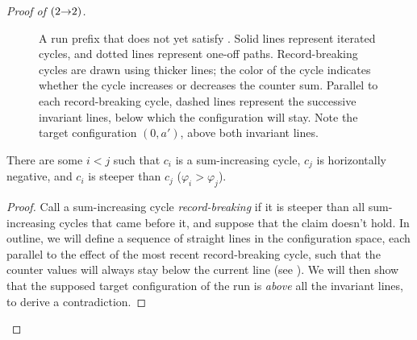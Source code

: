 \begin{proof}[Proof of  $({2}{\rightarrow}{2})$]
\begin{figure}[t]

\caption{A run prefix that does not yet satisfy .
Solid lines represent iterated cycles, and dotted lines represent 
one-off paths. Record-breaking cycles are drawn using thicker lines;
the color of the cycle indicates whether the cycle increases
or decreases the counter sum.
Parallel to each record-breaking cycle, dashed lines represent
the successive invariant lines, below which the configuration
will stay.
Note the target configuration $(0,a')$, above both invariant lines.
}
\label{fig:steep-counterexample}
\end{figure}


\begin{claim} \label{claim:steep}
    There are some $i<j$ such that $c_i$ is a sum-increasing cycle, $c_j$ is
    horizontally negative, and $c_i$ is steeper than $c_j$ (\ie $\varphi_i > \varphi_j$).
\end{claim}
%
\begin{proof}
Call a sum-increasing cycle \emph{record-breaking} if it is
steeper than all sum-increasing cycles that came before it,
and suppose that the claim doesn't hold.
In outline, we will define a sequence of straight lines in the configuration space,
each parallel to the effect of the most recent record-breaking cycle,
such that the counter values will always stay below the current line
(see ).
We will then show that the supposed target configuration of the run
is \emph{above} all the invariant lines, to derive a contradiction.


\end{proof}
\end{proof}
